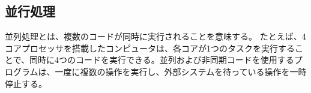 \documentclass[../../../main]{subfiles}
\begin{document}
    \subsection{並行処理}\label{subsec:phraseology-concurrency}

    並列処理とは、複数のコードが同時に実行されることを意味する。 たとえば、4コアプロセッサを搭載したコンピュータは、各コアが1つのタスクを実行することで、同時に4つのコードを実行できる。並列および非同期コードを使用するプログラムは、一度に複数の操作を実行し、外部システムを待っている操作を一時停止する。
\end{document}
